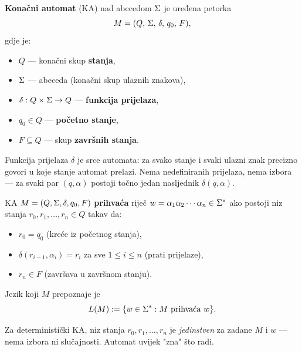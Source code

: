 \begin{definicija}
\textbf{Konačni automat} (KA) nad abecedom $\Sigma$ je uređena petorka
\[
  M = (Q,\, \Sigma,\, \delta,\, q_0,\, F),
\]
gdje je:
\begin{itemize}
  \item $Q$ --- konačni skup \textbf{stanja},
  \item $\Sigma$ --- abeceda (konačni skup ulaznih znakova),
  \item $\delta : Q \times \Sigma \to Q$ --- \textbf{funkcija prijelaza},
  \item $q_0 \in Q$ --- \textbf{početno stanje},
  \item $F \subseteq Q$ --- skup \textbf{završnih stanja}.
\end{itemize}
\end{definicija}

Funkcija prijelaza $\delta$ je srce automata: za svako stanje i svaki
ulazni znak precizno govori u koje stanje automat prelazi. Nema
nedefiniranih prijelaza, nema izbora --- za svaki par $(q, \alpha)$
postoji točno jedan nasljednik $\delta(q, \alpha)$.

\begin{definicija}
KA $M = (Q, \Sigma, \delta, q_0, F)$ \textbf{prihvaća} riječ
$w = \alpha_1 \alpha_2 \cdots \alpha_n \in \Sigma^*$ ako postoji niz stanja
$r_0, r_1, \ldots, r_n \in Q$ takav da:
\begin{itemize}
  \item $r_0 = q_0$ (kreće iz početnog stanja),
  \item $\delta(r_{i-1}, \alpha_i) = r_i$ za sve $1 \leq i \leq n$ (prati prijelaze),
  \item $r_n \in F$ (završava u završnom stanju).
\end{itemize}
Jezik koji $M$ prepoznaje je
\[
  L(M) := \{w \in \Sigma^* : M \text{ prihvaća } w\}.
\]
\end{definicija}

\begin{napomena}
Za deterministički KA, niz stanja $r_0, r_1, \ldots, r_n$ je
\emph{jedinstven} za zadane $M$ i $w$ --- nema izbora ni slučajnosti.
Automat uvijek "zna" što radi.
\end{napomena}

